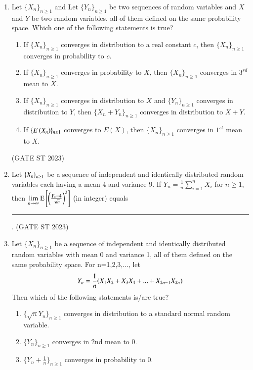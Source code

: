 \begin{enumerate}[label=\thechapter.\arabic*,ref=\thechapter.\theenumi]
\item Let $\{X_n\}_{n \geq 1}$ and Let $\{Y_n\}_{n \geq 1}$ be two sequences of random variables and $X$ and $Y$
be two random variables, all of them defined on the same probability space.
Which one of the following statements is true?
\begin{enumerate}[label=(\Alph*)]
\item If $\{X_n\}_{n \geq 1}$ converges in distribution to a real constant $c$, then $\{X_n\}_{n \geq 1}$
converges in probability to $c$.
\item If $\{X_n\}_{n \geq 1}$ converges in probability to $X$, then $\{X_n\}_{n \geq 1}$ converges in $3^{rd}$ mean
to $X$.
\item If $\{X_n\}_{n \geq 1}$ converges in distribution to $X$ and $\{Y_n\}_{n \geq 1}$ converges in
distribution to $Y$, then $\{X_n + Y_n\}_{n \geq 1}$ converges in distribution to $X+Y$.
\item If $\{E\left(X_n\right)\}_{n \geq 1}$ converges to $E(X)$, then $\{X_n\}_{n \geq 1}$ converges in $1^{st}$ mean to $X$.
\end{enumerate}
\hfill (GATE ST 2023)

\item Let $\left\{X_n\right\}_{n \geq 1}$ be a sequence of independent and identically distributed random variables each having a mean $4$ and variance $9$. If $Y_n = \frac{1}{n} \sum_{i=1}^{n} X_i$ for $n \geq 1$, then $\lim\limits_{n \to \infty} \text{E}{}\left[\left(\frac{Y_n - 4}{\sqrt{n}}\right)^2\right]$ (in integer) equals \rule{2cm}{0.1mm}. \hfill(GATE ST 2023)
\\
\solution

\item Let $\{X_n\}_{n \geq 1}$ be a sequence of independent and identically distributed random variables with mean 0 and variance 1, all of them defined on the same
probability space. For n=1,2,3,..., let
\begin{align}
Y_n=\frac{1}{n}{\left(X_1X_2+X_3X_4+...+X_{2n-1}X_{2n}\right)} 
\end{align}
Then which of the following statements is/are true? 
\begin{enumerate}[label=(\Alph*)]
\item $\{\sqrt{n}Y_n\}_{n \geq 1}$ converges in distribution to a standard normal random variable.
\item $\{Y_n\}_{n \geq 1}$ converges in 2nd mean to 0.
\item $\{Y_n+\frac{1}{n}\}_{n \geq 1}$ converges in probability to 0.

\end{enumerate}
\end{enumerate}
